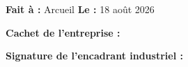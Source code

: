 \documentclass[a4paper,12pt]{article}
\begin{document}
\vspace{1.5cm}

\noindent
\textbf{Fait à :} Arcueil \hfill \textbf{Le :} 18 août 2026

\vspace{1.0cm}

\noindent
\begin{minipage}[t]{0.45\textwidth}
    \textbf{Cachet de l'entreprise :}
    \vspace{2.5cm}
    \begin{center}
        \dotfill
    \end{center}
\end{minipage}
\hfill
\begin{minipage}[t]{0.45\textwidth}
    \textbf{Signature de l'encadrant industriel :}
    \vspace{2.5cm}
    \begin{center}
        \dotfill
    \end{center}
\end{minipage}
\end{document}
